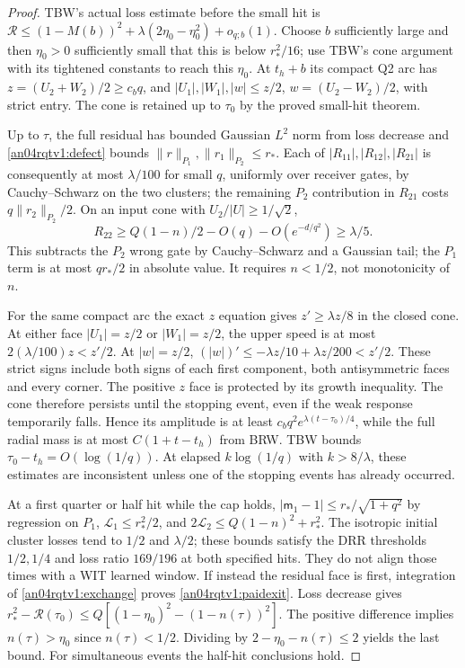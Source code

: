 \documentclass[11pt]{article}
\begin{document}
\begin{proof}
TBW's actual loss estimate before the small hit is
$\mathcal R\le(1-M(b))^2+\lambda(2\eta_0-\eta_0^2)+o_{q;b}(1)$.
Choose $b$ sufficiently large and then $\eta_0>0$ sufficiently
small that this is below $r_*^2/16$; use TBW's cone argument
with its tightened constants to reach this $\eta_0$.
At $t_h+b$ its compact Q2 arc has
$z=(U_2+W_2)/2\ge c_bq$, and
$|U_1|,|W_1|,|w|\le z/2$, $w=(U_2-W_2)/2$, with strict entry.
The cone is retained up to $\tau_0$ by the proved small-hit theorem.

Up to $\tau$, the full residual has bounded Gaussian $L^2$ norm
from loss decrease and \eqref{an04rqtv1:defect} bounds
$\|r\|_{P_1},\|r_1\|_{P_2}\le r_*$. Each of
$|R_{11}|,|R_{12}|,|R_{21}|$ is consequently at most $\lambda/100$
for small $q$, uniformly over receiver gates, by Cauchy--Schwarz
on the two clusters; the remaining $P_2$ contribution in $R_{21}$
costs $q\|r_2\|_{P_2}/2$. On an input cone with $U_2/|U|\ge1/\sqrt2$,
\[
 R_{22}\ge Q(1-n)/2-O(q)-O(e^{-d/q^2})\ge\lambda/5 .
\]
This subtracts the $P_2$ wrong gate by Cauchy--Schwarz and a
Gaussian tail; the $P_1$ term is at most $q r_*/2$ in absolute
value. It requires $n<1/2$, not monotonicity of $n$.

For the same compact arc the exact $z$ equation gives
$z'\ge\lambda z/8$ in the closed cone. At either face
$|U_1|=z/2$ or $|W_1|=z/2$, the upper speed is at most
$2(\lambda/100)z<z'/2$. At $|w|=z/2$,
$(|w|)'\le-\lambda z/10+\lambda z/200<z'/2$.
These strict signs include both signs of each first component,
both antisymmetric faces and every corner. The positive $z$ face
is protected by its growth inequality. The cone therefore persists
until the stopping event, even if the weak response temporarily
falls. Hence its amplitude is at least
$c_bq^2e^{\lambda(t-\tau_0)/4}$, while the full radial mass is
at most $C(1+t-t_h)$ from BRW. TBW bounds
$\tau_0-t_h=O(\log(1/q))$. At elapsed $k\log(1/q)$ with
$k>8/\lambda$, these estimates are inconsistent unless one of
the stopping events has already occurred.

At a first quarter or half hit while the cap holds,
$|\mathsf m_1-1|\le r_*/\sqrt{1+q^2}$ by regression on $P_1$,
$\mathcal L_1\le r_*^2/2$, and
$2\mathcal L_2\le Q(1-n)^2+r_*^2$.
The isotropic initial cluster losses tend to $1/2$ and
$\lambda/2$; these bounds satisfy the DRR thresholds
$1/2,1/4$ and loss ratio $169/196$ at both specified hits.
They do not align those times with a WIT learned window.
If instead the residual face is first, integration of
\eqref{an04rqtv1:exchange} proves \eqref{an04rqtv1:paidexit}.
Loss decrease gives
$r_*^2-\mathcal R(\tau_0)
 \le Q[(1-\eta_0)^2-(1-n(\tau))^2]$.
The positive difference implies $n(\tau)>\eta_0$ since
$n(\tau)<1/2$. Dividing by $2-\eta_0-n(\tau)\le2$ yields the
last bound. For simultaneous events the half-hit conclusions hold.
\end{proof}
\end{document}
